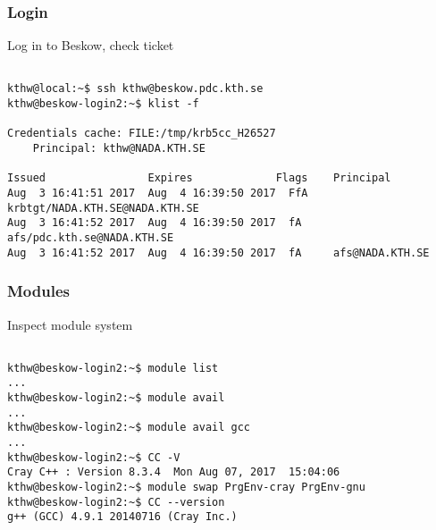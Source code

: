 

\begin{frame}[fragile]
  \frametitle{Login}
  \begin{alertblock}{Log in to Beskow, check ticket}
    \verbatimfont{\footnotesize}
    \begin{verbatim}

kthw@local:~$ ssh kthw@beskow.pdc.kth.se
kthw@beskow-login2:~$ klist -f

Credentials cache: FILE:/tmp/krb5cc_H26527
    Principal: kthw@NADA.KTH.SE

Issued                Expires             Flags    Principal
Aug  3 16:41:51 2017  Aug  4 16:39:50 2017  FfA    krbtgt/NADA.KTH.SE@NADA.KTH.SE
Aug  3 16:41:52 2017  Aug  4 16:39:50 2017  fA     afs/pdc.kth.se@NADA.KTH.SE
Aug  3 16:41:52 2017  Aug  4 16:39:50 2017  fA     afs@NADA.KTH.SE

 \end{verbatim}
\end{alertblock}



\end{frame}




\begin{frame}[fragile]
  \frametitle{Modules}
  \begin{alertblock}{Inspect module system}
    \verbatimfont{\footnotesize}
    \begin{verbatim}

kthw@beskow-login2:~$ module list
...
kthw@beskow-login2:~$ module avail
...
kthw@beskow-login2:~$ module avail gcc
...
kthw@beskow-login2:~$ CC -V
Cray C++ : Version 8.3.4  Mon Aug 07, 2017  15:04:06
kthw@beskow-login2:~$ module swap PrgEnv-cray PrgEnv-gnu
kthw@beskow-login2:~$ CC --version
g++ (GCC) 4.9.1 20140716 (Cray Inc.)

 \end{verbatim}
\end{alertblock}



\end{frame}



